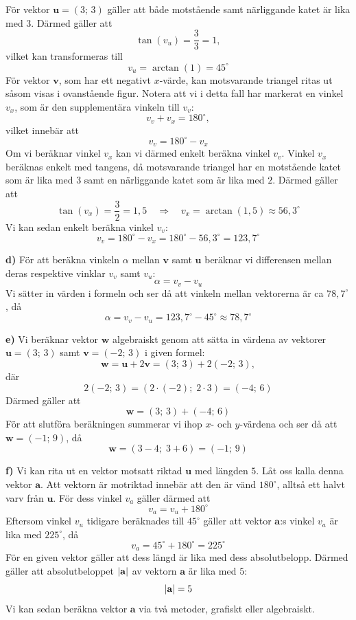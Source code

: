 \begin{exempel}
För vektor $\mathbf{u} = (3;\, 3)$ gäller att både motstående samt närliggande katet är lika
med $3$. Därmed gäller att
\[
  \tan(v_u) = \frac{3}{3} = 1,
\]
vilket kan transformeras till
\[
  v_u = \arctan(1) = 45^{\circ}
\]
För vektor $\mathbf{v}$, som har ett negativt $x$-värde, kan motsvarande triangel ritas ut såsom
visas i ovanstående figur. Notera att vi i detta fall har markerat en vinkel $v_x$, som är den
supplementära vinkeln till $v_v$:
\[
  v_v + v_x = 180^{\circ},
\]
vilket innebär att
\[
  v_v = 180^{\circ} - v_x
\]
Om vi beräknar vinkel $v_x$ kan vi därmed enkelt beräkna vinkel $v_v$. Vinkel $v_x$ beräknas
enkelt med tangens, då motsvarande triangel har en motstående katet som är lika med $3$ samt en
närliggande katet som är lika med $2$. Därmed gäller att
\[
  \tan(v_x) = \frac{3}{2} = 1{,}5 \quad \Rightarrow \quad
  v_x = \arctan(1{,}5) \approx 56{,}3^{\circ}
\]
Vi kan sedan enkelt beräkna vinkel $v_v$:
\[
  v_v = 180^{\circ} - v_x = 180^{\circ} - 56{,}3^{\circ} = 123{,}7^{\circ}
\]

\textbf{d)} För att beräkna vinkeln $\alpha$ mellan $\mathbf{v}$ samt $\mathbf{u}$ beräknar vi
differensen mellan deras respektive vinklar $v_v$ samt $v_u$:
\[
  \alpha = v_v - v_u
\]
Vi sätter in värden i formeln och ser då att vinkeln mellan vektorerna är ca $78{,}7^{\circ}$, då
\[
  \alpha = v_v - v_u = 123{,}7^{\circ} - 45^{\circ} \approx 78{,}7^{\circ}
\]

\textbf{e)} Vi beräknar vektor $\mathbf{w}$ algebraiskt genom att sätta in värdena av vektorer
$\mathbf{u} = (3;\, 3)$ samt $\mathbf{v} = (-2;\, 3)$ i given formel:
\[
  \mathbf{w} = \mathbf{u} + 2\mathbf{v} = (3;\, 3) + 2(-2;\, 3),
\]
där
\[
  2(-2;\, 3) = (2 \cdot (-2);\; 2 \cdot 3) = (-4;\, 6)
\]
Därmed gäller att
\[
  \mathbf{w} = (3;\, 3) + (-4;\, 6)
\]
För att slutföra beräkningen summerar vi ihop $x$- och $y$-värdena och ser då att
$\mathbf{w} = (-1;\, 9)$, då
\[
  \mathbf{w} = (3 - 4;\; 3 + 6) = (-1;\, 9)
\]

\textbf{f)} Vi kan rita ut en vektor motsatt riktad $\mathbf{u}$ med längden $5$. Låt oss kalla
denna vektor $\mathbf{a}$. Att vektorn är motriktad innebär att den är vänd $180^{\circ}$,
alltså ett halvt varv från $\mathbf{u}$. För dess vinkel $v_a$ gäller därmed att
\[
  v_a = v_u + 180^{\circ}
\]
Eftersom vinkel $v_u$ tidigare beräknades till $45^{\circ}$ gäller att vektor $\mathbf{a}$:s
vinkel $v_a$ är lika med $225^{\circ}$, då
\[
  v_a = 45^{\circ} + 180^{\circ} = 225^{\circ}
\]
För en given vektor gäller att dess längd är lika med dess absolutbelopp. Därmed gäller att
absolutbeloppet $\lvert\mathbf{a}\rvert$ av vektorn $\mathbf{a}$ är lika med $5$:
\[
  \lvert\mathbf{a}\rvert = 5
\]
Vi kan sedan beräkna vektor $\mathbf{a}$ via två metoder, grafiskt eller algebraiskt.


\end{exempel}
